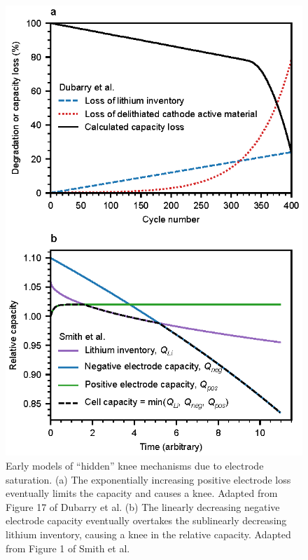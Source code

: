 \documentclass[journal=jpclcd,manuscript=article]{achemso}
\begin{document}
\begin{figure}[hp]
\centering
\includegraphics[scale = 1]{figures/electrode_saturation.eps}
\caption{Early models of ``hidden'' knee mechanisms due to electrode saturation. (a) The exponentially increasing positive electrode loss eventually limits the capacity and causes a knee. Adapted from Figure 17 of Dubarry et al.\cite{dubarry_synthesize_2012}
(b) The linearly decreasing negative electrode capacity eventually overtakes the sublinearly decreasing lithium inventory, causing a knee in the relative capacity. Adapted from Figure 1 of Smith et al.\cite{smith_life_2017}
}
\label{fig:electrode_sat_simple}
\end{figure}
\end{document}
